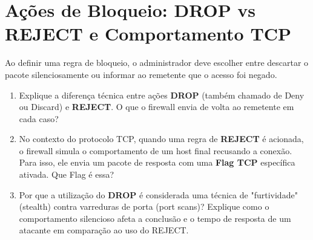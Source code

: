 \section{Ações de Bloqueio: DROP vs REJECT e Comportamento TCP}
Ao definir uma regra de bloqueio, o administrador deve escolher entre descartar o pacote silenciosamente ou informar ao remetente que o acesso foi negado.

\begin{enumerate}
    \item Explique a diferença técnica entre ações \textbf{DROP} (também chamado de Deny ou Discard) e \textbf{REJECT}. O que o firewall envia de volta ao remetente em cada caso?
    \item No contexto do protocolo TCP, quando uma regra de \textbf{REJECT} é acionada, o firewall simula o comportamento de um host final recusando a conexão. Para isso, ele envia um pacote de resposta com uma \textbf{Flag TCP} específica ativada. Que Flag é essa?
    \item Por que a utilização do \textbf{DROP} é considerada uma técnica de "furtividade" (stealth) contra varreduras de porta (port scans)? Explique como o comportamento silencioso afeta a conclusão e o tempo de resposta de um atacante em comparação ao uso do REJECT.
\end{enumerate}

